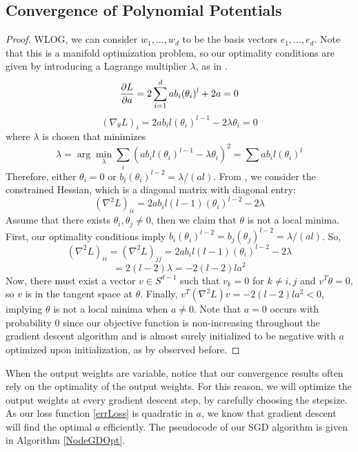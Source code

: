 
\subsection{Convergence of Polynomial Potentials}

\polystrict*

\begin{proof}
WLOG, we can consider $w_1,...,w_d$ to be the basis vectors $e_1,...,e_d$. Note that this is a manifold optimization problem, so our optimality conditions are given by introducing a Lagrange multiplier $\lambda$, as in \cite{GeHJY15}.
\[\frac{\partial L}{\partial a} = 2\sum_{i=1}^d ab_i (\theta_i)^l + 2a = 0\]
\[ (\nabla_\theta L)_i = 2ab_il(\theta_i)^{l-1}  -2\lambda \theta_i = 0 \]
where $\lambda$ is chosen that minimizes 
\[\lambda = \arg \min_\lambda \sum_i (ab_i l (\theta_i)^{l-1} - \lambda\theta_i)^2 = \sum ab_i l (\theta_i)^l \]
Therefore, either $\theta_i = 0$ or $b_i (\theta_i)^{l-2} = \lambda/(al)$. From \cite{GeHJY15}, we consider the constrained Hessian, which is a diagonal matrix with diagonal entry: 
\[(\nabla^2 L)_{ii} = 2a b_i l(l-1)(\theta_i)^{l-2} - 2 \lambda\]
Assume that there exists $\theta_i, \theta_j \neq 0$, then we claim that $\theta$ is not a local minima. First, our optimality conditions imply $b_i(\theta_i)^{l-2} = b_j (\theta_j)^{l-2} = \lambda/(al)$. So,
\[(\nabla^2 L)_{ii} = (\nabla^2L)_{jj} = 2a b_i l(l-1)(\theta_i)^{l-2} - 2 \lambda\]
\[ = 2(l-2)\lambda = -2(l-2)la^2\]
Now, there must exist a vector $v \in S^{d-1}$ such that $v_k = 0$ for $k \neq i,j$ and $v^T\theta = 0$, so $v$ is in the tangent space at $\theta$. Finally, $v^T(\nabla^2 L) v  = -2(l-2)l a^2 < 0$, implying $\theta$ is not a local minima when $a \neq 0$. Note that $a = 0$ occurs with probability 0 since our objective function is non-increasing throughout the gradient descent algorithm and is almost surely initialized to be negative with $a$ optimized upon initialization, as by observed before.
\end{proof}

When the output weights are variable, notice that our convergence results often rely on the optimality of the output weights. For this reason, we will optimize the output weights at every gradient descent step, by carefully choosing the stepsize. As our loss function \eqref{errLoss} is quadratic in $a$, we know that gradient descent will find the optimal $a$ efficiently. The pseudocode of our SGD algorithm is given in Algorithm \ref{NodeGDOpt}. 






